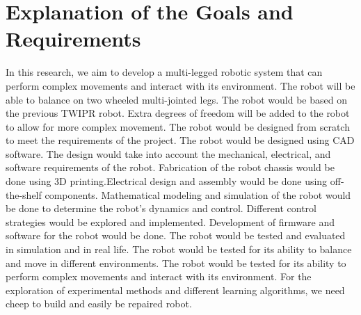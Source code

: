 \section{Explanation of the Goals and Requirements}
In this research, we aim to develop a multi-legged robotic system that can perform complex movements and interact with its environment.
The robot will be able to balance on two wheeled multi-jointed legs.
The robot would be based on the previous TWIPR robot.
Extra degrees of freedom will be added to the robot to allow for more complex movement.
The robot would be designed from scratch to meet the requirements of the project.
The robot would be designed using CAD software.
The design would take into account the mechanical, electrical, and software requirements of the robot.
Fabrication of the robot chassis would be done using 3D printing.Electrical design and assembly would be done using off-the-shelf components.
Mathematical modeling and simulation of the robot would be done to determine the robot's dynamics and control.
Different control strategies would be explored and implemented.
Development of firmware and software for the robot would be done.
The robot would be tested and evaluated in simulation and in real life.
The robot would be tested for its ability to balance and move in different environments.
The robot would be tested for its ability to perform complex movements and interact with its environment.
For the exploration of experimental methods and different learning algorithms, we need cheep to build and easily be repaired robot.